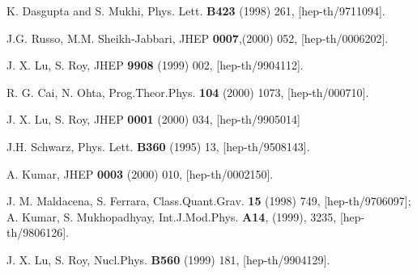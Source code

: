 \documentclass[a4paper,12pt]{article}
\begin{document}
\begin{thebibliography}{99}
 K. Dasgupta and S. Mukhi, Phys. Lett. {\bf B423} (1998) 
261, [hep-th/9711094]. 

  J.G. Russo, M.M. Sheikh-Jabbari, JHEP {\bf 0007},(2000) 
052, [hep-th/0006202].

 J. X. Lu, S. Roy, JHEP {\bf 9908} (1999) 002,
  [hep-th/9904112].

 R. G. Cai, N. Ohta, Prog.Theor.Phys. {\bf 104} (2000)
 1073, [hep-th/000710]. 

 J. X. Lu, S. Roy, JHEP {\bf 0001} (2000) 034, [hep-th/9905014]


 J.H. Schwarz, Phys. Lett. {\bf B360} (1995) 13, 
[hep-th/9508143].

 A. Kumar, JHEP {\bf 0003} (2000) 010, [hep-th/0002150]. 

 J. M. Maldacena,
  S. Ferrara, Class.Quant.Grav. {\bf 15} (1998) 749, [hep-th/9706097];
A. Kumar, S. Mukhopadhyay, Int.J.Mod.Phys. {\bf A14}, 
(1999), 3235, [hep-th/9806126].

 J. X. Lu, S. Roy, Nucl.Phys. {\bf B560} (1999) 181, 
[hep-th/9904129].
 

 

     


\end{thebibliography}
\end{document}
